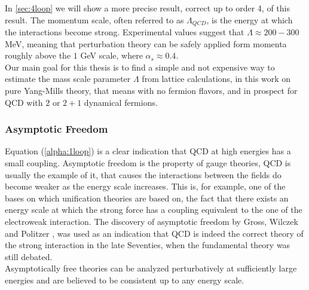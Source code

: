 In \cref{sec:4loop} we will show a more precise result, correct up to order 4, of this result. The momentum scale, often referred to as $\Lambda_{QCD}$, is the energy at which the interactions become strong. Experimental values \cite{dissertori_9._2016} suggest that $\Lambda \approx 200-300$ MeV, meaning that perturbation theory can be safely applied form momenta roughly above the $1$ GeV scale, where $\alpha_s\approx 0.4$. \\
Our main goal for this thesis is to find a simple and not expensive way to estimate the mass scale parameter $\Lambda$ from lattice calculations, in this work on pure Yang-Mills theory, that means with no fermion flavors, and in prospect for QCD with $2$ or $2+1$ dynamical fermions.

\subsubsection{Asymptotic Freedom}
Equation (\ref{alpha:1loop}) is a clear indication that QCD at high energies has a small coupling. Asymptotic freedom is the property of gauge theories, QCD is usually the example of it, that causes the interactions between the fields do become weaker as the energy scale increases. This is, for example, one of the bases on which unification theories are based on, the fact that there exists an energy scale at which the strong force has a coupling equivalent to the one of the electroweak interaction.  
The discovery of asymptotic freedom by Gross, Wilczek and Politzer \cite{Gross-Wilczek}\cite{Politzer},  was used as an indication that QCD is indeed the correct theory of the strong interaction in the late Seventies, when the fundamental theory was still debated.\\
Asymptotically free theories can be analyzed perturbatively at sufficiently large energies and are believed to be consistent up to any energy scale.

